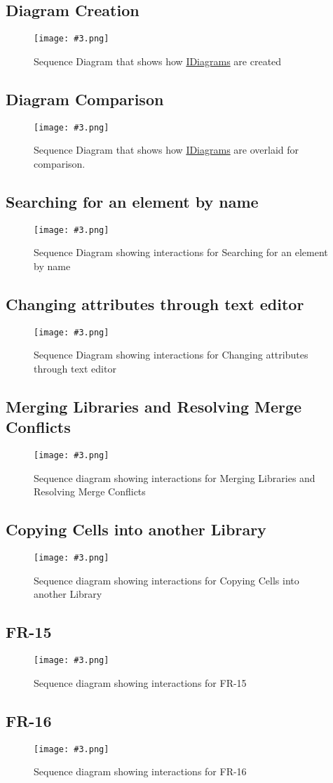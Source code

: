 \documentclass[10pt,a4paper]{report}
\newcommand{\refer}[2]{\hyperref[#1]{\textcolor{col:reference}{#2}}}
\newcommand{\includeimage}[5]{
    \begin{figure}[H]
        #1
        \texttt{[image: \#3.png]}
        \caption{#4}
        \label{fig:#5}
    \end{figure}
}
\newcommand{\packagebeginning}{edu.kit.informatik.pse.gelf} %
\newcommand{\lblroot}{lbl} %
\newcommand{\lblpackage}{} %
\newcommand{\lblpackageelement}{} %
\newcommand{\lblpackageelementmember}{} %
\newcommand{\lblpackageelementmemberparameter}{} %
\newcommand{\casclabelname}{\lblroot\lblpackage\lblpackageelement\lblpackageelementmember\lblpackageelementmemberparameter}
\newcommand{\casclabel}{\label{\casclabelname}}
\begin{document}
\subsection{Diagram Creation}
\includeimage{}{0.32}{DiagramCreation}{Sequence Diagram that shows how \refer{\lblroot:view.diagrams:IDiagram}{IDiagrams} are created}{Diagram Creation}
\subsection{Diagram Comparison}
\includeimage{}{0.32}{DiagramComparison}{Sequence Diagram that shows how \refer{\lblroot:view.diagrams:IDiagram}{IDiagrams} are overlaid for comparison.}{Diagram Comparison}
\subsection{Searching for an element by name}
\includeimage{}{0.42}{FR-9}{Sequence Diagram showing interactions for Searching for an element by name}{FR-9}
\subsection{Changing attributes through text editor}
\includeimage{}{0.35}{FR10}{Sequence Diagram showing interactions for Changing attributes through text editor}{FR-10}
\subsection{Merging Libraries and Resolving Merge Conflicts}
\includeimage{}{0.20}{FR-12,13}{Sequence diagram showing interactions for Merging Libraries and Resolving Merge Conflicts}{FR-12 and FR-13}
\subsection{Copying Cells into another Library}
\includeimage{}{0.27}{FR-14}{Sequence diagram showing interactions for Copying Cells into another Library}{Copying Cells into another Library}
\subsection{FR-15}
\includeimage{}{0.30}{removingalibrary}{Sequence diagram showing interactions for FR-15}{Removing Libraries}
\subsection{FR-16}
\includeimage{}{0.25}{deletingcell}{Sequence diagram showing interactions for FR-16}{Deleting Cells}
\end{document}
